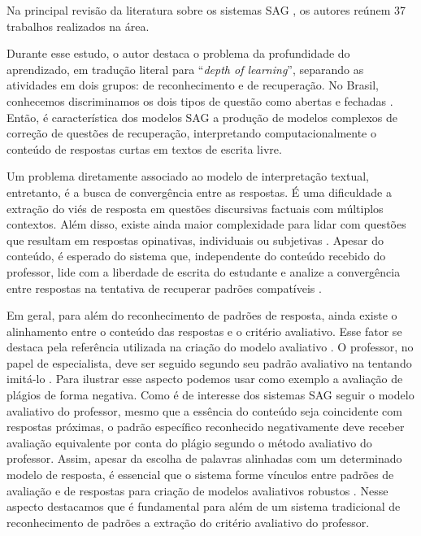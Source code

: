 Na principal revisão da literatura sobre os sistemas SAG \cite{burrows2015}, os autores reúnem 37 trabalhos realizados na área.

 Durante esse estudo, o autor destaca o problema da  profundidade do aprendizado, em tradução literal para ``\textit{depth of learning}'', separando as atividades em dois grupos: de reconhecimento e de recuperação. No Brasil, conhecemos discriminamos os dois tipos de questão como abertas e fechadas \cite{gunther2012}. Então, é característica dos modelos SAG a produção de modelos complexos de correção de questões de recuperação, interpretando computacionalmente o conteúdo de respostas curtas em textos de escrita livre.

Um problema diretamente associado ao modelo de interpretação textual, entretanto, é a busca de convergência entre as respostas. É uma dificuldade a extração do viés de resposta em questões discursivas factuais com múltiplos contextos. Além disso, existe ainda maior complexidade para lidar com questões que resultam em respostas opinativas, individuais ou subjetivas \cite{bailey2008}. Apesar do conteúdo, é esperado do sistema que, independente do conteúdo recebido do professor, lide com a liberdade de escrita do estudante e analize a convergência entre respostas na tentativa de recuperar padrões compatíveis \cite{saha2018}. 

Em geral, para além do reconhecimento de padrões de resposta, ainda existe o alinhamento entre o conteúdo das respostas e o critério avaliativo. Esse fator se destaca pela referência utilizada na criação do modelo avaliativo \cite{krithika2015}. O professor, no papel de especialista, deve ser seguido segundo seu padrão avaliativo na tentando imitá-lo \cite{jordan2012, funayama2020}. Para ilustrar esse aspecto podemos usar como exemplo a avaliação de plágios de forma negativa. Como é de interesse dos sistemas SAG seguir o modelo avaliativo do professor, mesmo que a essência do conteúdo seja coincidente com respostas próximas, o padrão específico reconhecido negativamente deve receber avaliação equivalente por conta do plágio segundo o método avaliativo do professor. Assim, apesar da escolha de palavras alinhadas com um determinado modelo de resposta, é essencial que o sistema forme vínculos entre padrões de avaliação e de respostas para criação de modelos avaliativos robustos \cite{higgins2014}. Nesse aspecto destacamos que é fundamental para além de um sistema tradicional de reconhecimento de padrões a extração do critério avaliativo do professor.

